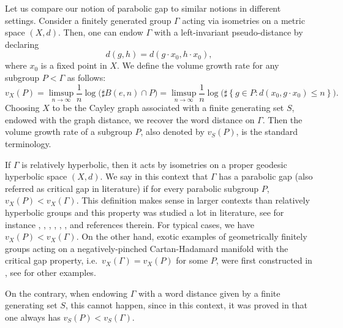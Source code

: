 \documentclass{amsart}
\theoremstyle{definition}
\theoremstyle{remark}
\begin{document}
\medskip
Let us compare our notion of parabolic gap   to similar notions in different settings.
Consider a finitely generated group $\Gamma$ acting via isometries on a metric space $(X,d)$.
Then, one can endow $\Gamma$ with a left-invariant pseudo-distance by declaring
$$d(g,h)=d(g\cdot x_0,h\cdot x_0),$$
where $x_0$ is a fixed point in $X$.
 We define the volume growth rate for any subgroup $P<\Gamma$ as follows:
$$v_X(P)=\limsup_{n\to \infty} \frac{1}{n}\log \big( \sharp B(e,n)\cap P\big)=\limsup_{n\to \infty}\frac{1}{n}\log \big (\sharp \left \{g\in P: d(x_0,g\cdot x_0)\leq n\right \}\big).$$
Choosing $X$ to be the Cayley graph associated with a finite generating set $S$, endowed with the graph distance, we recover the word distance on $\Gamma$.
Then the volume growth rate of a subgroup $P$, also denoted by $v_S(P)$, is the standard terminology.


If $\Gamma$ is relatively hyperbolic, then it acts by isometries on a proper geodesic hyperbolic space $(X,d)$.
We say in this context that $\Gamma$ has a parabolic gap (also referred as critical gap in literature) if for every parabolic subgroup $P$, $v_X(P)<v_X(\Gamma)$.
This definition makes sense in larger contexts than relatively hyperbolic groups and
this property was studied a lot in literature, see for instance \cite{DOP}, \cite{DPPS}, \cite{PS18}, \cite{PTV}, \cite{Rob}, \cite{ST21}, \cite{Vidotto} and references therein.
For typical cases, we have $v_X(P)<v_X(\Gamma)$.
On the other hand, exotic examples   of  geometrically finitely groups acting on a negatively-pinched Cartan-Hadamard manifold with the critical gap property, i.e.\ $v_X(\Gamma)=v_X(P)$ for some $P$, were first constructed in \cite{DOP}, see \cite{Peigne} for other examples.



On the contrary, when endowing $\Gamma$ with a word distance given by a finite generating set $S$, this cannot happen,
since in this context, it was proved in \cite{DFW} that one always has $v_S(P)<v_S(\Gamma)$.
\end{document}
